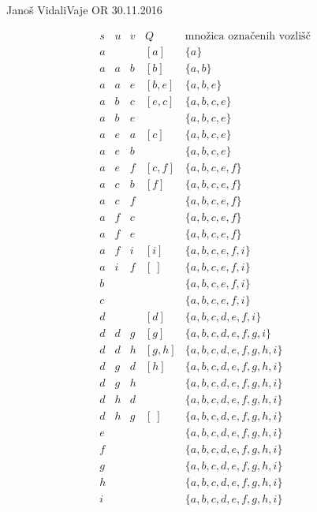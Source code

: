 \begin{naloga}{Janoš Vidali}{Vaje OR 30.11.2016}
\begin{odgovor}
\begin{tabela}
$$
\begin{array}{c|c|c|c|c}
s & u & v & Q & \text{množica označenih vozlišč} \\ \hline
a &   &   & [a]  & \{a\} \\
a & a & b & [b] & \{a, b\} \\
a & a & e & [b, e] & \{a, b, e\} \\
a & b & c & [e, c] & \{a, b, c, e\} \\
a & b  & e &  & \{a, b, c, e\} \\
a & e & a & [c] & \{a, b, c, e\} \\
a & e & b &  & \{a, b, c, e\} \\
a & e & f & [c, f] & \{a, b, c, e, f\} \\
a & c  & b & [f] &  \{a, b, c, e, f\} \\
a & c & f &  &  \{a, b, c, e, f\} \\
a & f & c &  &  \{a, b, c, e, f\} \\
a & f  & e &  &  \{a, b, c, e, f\} \\
a & f & i & [i] &  \{a, b, c, e, f, i\} \\
a & i  & f & [\ ] &  \{a, b, c, e, f, i\} \\
b & & & &  \{a, b, c, e, f, i\} \\
c & & & &  \{a, b, c, e, f, i\} \\
d & & & [d] &  \{a, b, c, d, e, f, i\} \\
d &d &g &[g] &  \{a, b, c, d, e, f, g, i\} \\
d &d &h &[g, h] &  \{a, b, c, d, e, f, g, h, i\} \\
d &g &d &[h] &  \{a, b, c, d, e, f, g, h, i\} \\
d &g &h & &  \{a, b, c, d, e, f, g, h, i\} \\
d &h &d & &  \{a, b, c, d, e, f, g, h, i\} \\
d &h &g &  [\ ]&  \{a, b, c, d, e, f, g, h, i\} \\
e & & & &  \{a, b, c, d, e, f, g, h, i\} \\
f & & & &  \{a, b, c, d, e, f, g, h, i\} \\
g & & & &  \{a, b, c, d, e, f, g, h, i\} \\
h & & & &  \{a, b, c, d, e, f, g, h, i\} \\
i & & & &  \{a, b, c, d, e, f, g, h, i\} \\
\end{array}
$$
\end{tabela}

\begin{slika}
\end{slika}

\end{odgovor}
\end{naloga}
